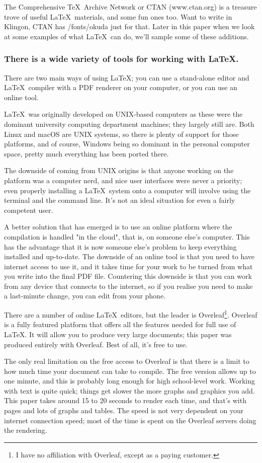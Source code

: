 \documentclass[12pt]{extarticle}
\begin{document}
The Comprehensive \TeX\ Archive Network or CTAN (www.ctan.org) is a treasure trove of useful \LaTeX\ materials, and some fun ones too. Want to write in Klingon, CTAN has /fonts/okuda just for that. Later in this paper when we look at some examples of what \LaTeX\ can do, we'll sample some of these additions.
\subsubsection{There is a wide variety of tools for working with \LaTeX.}
There are two main ways of using \LaTeX; you can use a stand-alone editor and \LaTeX\ compiler with a PDF renderer on your computer, or you can use an online tool.

\LaTeX\ was originally developed on UNIX-based computers as these were the dominant university computing department machines; they largely still are. Both Linux and macOS are UNIX systems, so there is plenty of support for those platforms, and of course, Windows being so dominant in the personal computer space, pretty much everything has been ported there.

The downside of coming from UNIX origins is that anyone working on the platform was a computer nerd, and nice user interfaces were never a priority; even properly installing a \LaTeX\ system onto a computer will involve using the terminal and the command line. It's not an ideal situation for even a fairly competent user.

A better solution that has emerged is to use an online platform where the compilation is handled "in the cloud", that is, on someone else's computer. This has the advantage that it is now someone else's problem to keep everything installed and up-to-date. The downside of an online tool is that you need to have internet access to use it, and it takes time for your work to be turned from what you write into the final PDF file. Countering this downside is that you can work from any device that connects to the internet, so if you realise you need to make a last-minute change, you can edit from your phone.

There are a number of online \LaTeX\ editors, but the leader is Overleaf\footnote{I have no affiliation with Overleaf, except as a paying customer.}. Overleaf is a fully featured platform that offers all the features needed for full use of \LaTeX. It will allow you to produce very large documents; this paper was produced entirely with Overleaf. Best of all, it's free to use.

The only real limitation on the free access to Overleaf is that there is a limit to how much time your document can take to compile. The free version allows up to one minute, and this is probably long enough for high school-level work. Working with text is quite quick; things get slower the more graphs and graphics you add. This paper takes around 15 to 20 seconds to render each time, and that's with \pageref{LastPage} pages and lots of graphs and tables. The speed is not very dependent on your internet connection speed; most of the time is spent on the Overleaf servers doing the rendering.
\end{document}
